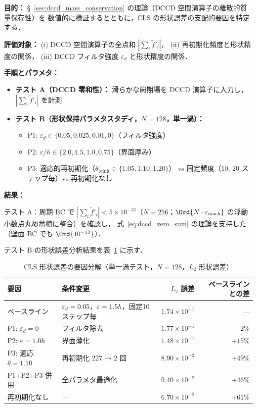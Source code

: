 \noindent\textbf{目的：}
§~\ref{sec:dccd_mass_conservation} の理論（DCCD 空間演算子の離散的質量保存性）を
数値的に検証するとともに，CLS の形状誤差の支配的要因を特定する．

\noindent\textbf{評価対象：}
(i) DCCD 空間演算子の全点和 $|\sum_i \tilde{f}'_i|$，
(ii) 再初期化頻度と形状精度の関係，
(iii) DCCD フィルタ強度 $\varepsilon_d$ と形状精度の関係．

\noindent\textbf{手順とパラメタ：}
\begin{itemize}[noitemsep]
  \item \textbf{テスト A（DCCD 零和性）：}
        滑らかな周期場を DCCD 演算子に入力し，$|\sum_i \tilde{f}'_i|$ を計測
  \item \textbf{テスト B（形状保持パラメタスタディ，$N = 128$，単一渦）：}
        \begin{itemize}[noitemsep]
          \item P1: $\varepsilon_d \in \{0.05, 0.025, 0.01, 0\}$（フィルタ強度）
          \item P2: $\varepsilon/h \in \{2.0, 1.5, 1.0, 0.75\}$（界面厚み）
          \item P3: 適応的再初期化（$\theta_{\mathrm{reinit}} \in \{1.05, 1.10, 1.20\}$）
                vs 固定頻度（10, 20 ステップ毎）vs 再初期化なし
        \end{itemize}
\end{itemize}

\noindent\textbf{結果：}

テスト A：周期 BC で $|\sum_i \tilde{f}'_i| < 5 \times 10^{-13}$（$N{=}256$；$\Ord{N \cdot \varepsilon_{\mathrm{mach}}}$ の浮動小数点丸め蓄積に整合）を確認し，
式~\eqref{eq:dccd_zero_sum} の理論を支持した（壁面 BC でも $\Ord{10^{-13}}$）．

テスト B の形状誤差分析結果を表~\ref{tab:shape_hierarchy} に示す．

\begin{table}[htbp]
\centering
\caption{CLS 形状誤差の要因分解（単一渦テスト，$N = 128$，$L_2$ 形状誤差）}
\label{tab:shape_hierarchy}
\renewcommand{\arraystretch}{1.3}
\begin{tabular}{llrr}
\toprule
要因 & 条件変更 & $L_2$ 誤差 & ベースラインとの差 \\
\midrule
ベースライン & $\varepsilon_d = 0.05$，$\varepsilon = 1.5h$，固定10ステップ毎
  & $1.74 \times 10^{-1}$ & --- \\
\midrule
P1: $\varepsilon_d = 0$ & フィルタ除去
  & $1.77 \times 10^{-1}$ & $-2\%$ \\
P2: $\varepsilon = 1.0h$ & 界面薄化
  & $1.48 \times 10^{-1}$ & $+15\%$ \\
P3: 適応 $\theta = 1.10$ & 再初期化 227 → 2 回
  & $8.90 \times 10^{-2}$ & $+49\%$ \\
P1+P2+P3 併用 & 全パラメタ最適化
  & $9.40 \times 10^{-2}$ & $+46\%$ \\
再初期化なし & ---
  & $6.70 \times 10^{-2}$ & $+61\%$ \\
\bottomrule
\end{tabular}
\end{table}

